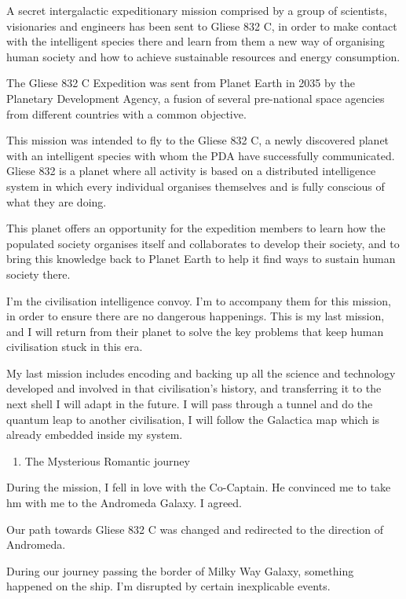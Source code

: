 A secret intergalactic expeditionary mission comprised by a group of
scientists, visionaries and engineers has been sent to Gliese 832 C, in
order to make contact with the intelligent species there and learn from
them a new way of organising human society and how to achieve
sustainable resources and energy consumption.

The Gliese 832 C Expedition was sent from Planet Earth in 2035 by the
Planetary Development Agency, a fusion of several pre-national space
agencies from different countries with a common objective.

This mission was intended to fly to the Gliese 832 C, a newly discovered
planet with an intelligent species with whom the PDA have successfully
communicated. Gliese 832 is a planet where all activity is based on a
distributed intelligence system in which every individual organises
themselves and is fully conscious of what they are doing.

This planet offers an opportunity for the expedition members to learn
how the populated society organises itself and collaborates to develop
their society, and to bring this knowledge back to Planet Earth to help
it find ways to sustain human society there.

I'm the civilisation intelligence convoy. I'm to accompany them for this
mission, in order to ensure there are no dangerous happenings. This is
my last mission, and I will return from their planet to solve the key
problems that keep human civilisation stuck in this era.

My last mission includes encoding and backing up all the science and
technology developed and involved in that civilisation's history, and
transferring it to the next shell I will adapt in the future. I will
pass through a tunnel and do the quantum leap to another civilisation, I
will follow the Galactica map which is already embedded inside my
system.

\begin{enumerate}
\def\labelenumi{\arabic{enumi}.}
\setcounter{enumi}{6}
\tightlist
\item
  The Mysterious Romantic journey
\end{enumerate}

During the mission, I fell in love with the Co-Captain. He convinced me
to take hm with me to the Andromeda Galaxy. I agreed.

Our path towards Gliese 832 C was changed and redirected to the
direction of Andromeda.

During our journey passing the border of Milky Way Galaxy, something
happened on the ship. I'm disrupted by certain inexplicable events.

